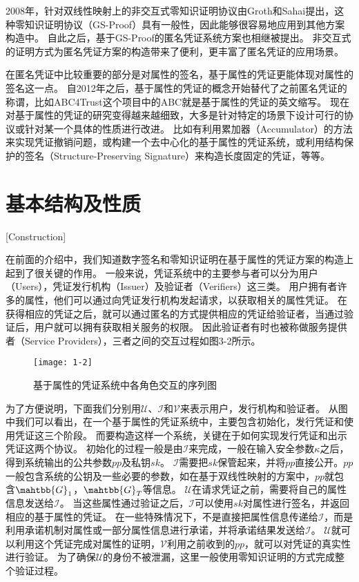 2008年，针对双线性映射上的非交互式零知识证明协议\cite{groth2008efficient}由Groth和Sahai提出，这种零知识证明协议（GS-Proof）具有一般性，因此能够很容易地应用到其他方案构造中。
自此之后，基于GS-Proof的匿名凭证系统方案也相继被提出\cite{belenkiy2008p,belenkiy2009randomizable}。
非交互式的证明方式为匿名凭证方案的构造带来了便利，更丰富了匿名凭证的应用场景。

在匿名凭证中比较重要的部分是对属性的签名，基于属性的凭证更能体现对属性的签名这一点。
自2012年之后，基于属性的凭证的概念开始替代了之前匿名凭证的称谓\cite{sabouri2012attribute}，比如ABC4Trust这个项目中的ABC就是基于属性的凭证的英文缩写。
现在对基于属性的凭证的研究变得越来越细致，大多是针对特定的场景下设计可行的协议或针对某一个具体的性质进行改进。
比如有利用累加器（Accumulator）的方法来实现凭证撤销问题\cite{camenisch2009accumulator}，或构建一个去中心化的基于属性的凭证系统\cite{garman2014decentralized}，或利用结构保护的签名（Structure-Preserving Signature）来构造长度固定的凭证\cite{fuchsbauer2018structure}，等等。

\section{基本结构及性质}[Construction]

在前面的介绍中，我们知道数字签名和零知识证明在基于属性的凭证方案的构造上起到了很关键的作用。
一般来说，凭证系统中的主要参与者可以分为用户（Users），凭证发行机构（Issuer）及验证者（Verifiers）这三类。
用户拥有者许多的属性，他们可以通过向凭证发行机构发起请求，以获取相关的属性凭证。
在获得相应的凭证之后，就可以通过匿名的方式提供相应的凭证给验证者，当通过验证后，用户就可以拥有获取相关服务的权限。
因此验证者有时也被称做服务提供者（Service Providers），三者之间的交互过程如图3-2所示。

\begin{figure}[h]
\centering
\texttt{[image: 1-2]}
\caption{基于属性的凭证系统中各角色交互的序列图}
\end{figure}

为了方便说明，下面我们分别用$\mathcal{U}$、$\mathcal{I}$和$\mathcal{V}$来表示用户，发行机构和验证者。
从图中我们可以看出，在一个基于属性的凭证系统中，主要包含初始化，发行凭证和使用凭证这三个阶段。
而要构造这样一个系统，关键在于如何实现发行凭证和出示凭证这两个协议。
初始化的过程一般是由$\mathcal{I}$来完成，一般在输入安全参数$\kappa$之后，得到系统输出的公共参数$pp$及私钥$sk$。
$\mathcal{I}$需要把$sk$保管起来，并将$pp$直接公开。$pp$一般包含系统的公钥及一些必要的参数，如在基于双线性映射的方案中，$pp$就包含$\mahtbb{G}_1$，$\mahtbb{G}_T$等信息。
$\mathcal{U}$在请求凭证之前，需要将自己的属性信息发送给$\mathcal{I}$。
当这些属性通过验证之后，$\mathcal{I}$可以使用$sk$对属性进行签名，并返回相应的基于属性的凭证。
在一些特殊情况下，不是直接把属性信息传递给$\mathcal{I}$，而是利用承诺机制对属性或一部分属性信息进行承诺，并将承诺结果发送给$\mathcal{I}$。
$\mathcal{U}$就可以利用这个凭证完成对属性的证明，$\mathcal{V}$利用之前收到的$pp$，就可以对凭证的真实性进行验证。
为了确保$\mathcal{U}$的身份不被泄漏，这里一般使用零知识证明的方式完成整个验证过程。

